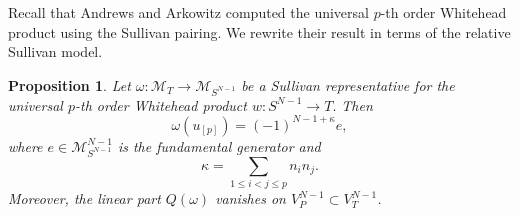 \documentclass[a4paper,10pt]{amsart}
\newtheorem{prop}[thm]{Proposition}
\theoremstyle{definition}
\theoremstyle{remark}
\numberwithin{equation}{section}
\begin{document}
Recall that Andrews and Arkowitz \cite[Proposition~4.7]{AA1978}
computed the universal $p$-th order Whitehead product using the Sullivan
pairing. We rewrite their result in terms of the relative Sullivan model.

\begin{prop}\label{prop:model_universal-HOP}
Let
$
\omega:\mathcal M_T\to \mathcal M_{S^{N-1}}
$
be a Sullivan representative for the universal $p$-th order Whitehead product
$
w:S^{N-1}\to T.
$
Then
\[
        \omega(u_{[p]})=(-1)^{N-1+\kappa}e,
\]
where $e\in \mathcal M_{S^{N-1}}^{N-1}$ is the fundamental generator and
\[
        \kappa=\sum_{1\leq i<j\leq p} n_i n_j .
\]
Moreover, the linear part $Q(\omega)$ vanishes on $V_P^{N-1}\subset V_T^{N-1}$.
\end{prop}
\end{document}
